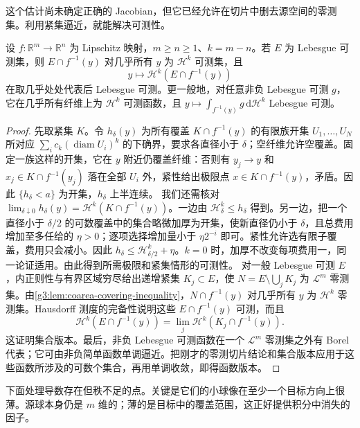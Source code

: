 这个估计尚未确定正确的 Jacobian，但它已经允许在切片中删去源空间的零测集。利用紧集逼近，就能解决可测性。

\begin{lemma}\label{g3:lem:coarea-slice-measurability}
	设 \(f:\mathbb R^m\to\mathbb R^n\) 为 Lipschitz 映射，\(m\ge n\ge1\)、\(k=m-n\)。若 \(E\) 为 Lebesgue 可测集，则 \(E\cap f^{-1}(y)\) 对几乎所有 \(y\) 为 \(\mathcal H^k\) 可测集，且
	\[
		y\longmapsto\mathcal H^k(E\cap f^{-1}(y))
	\]
	在取几乎处处代表后 Lebesgue 可测。更一般地，对任意非负 Lebesgue 可测 \(g\)，它在几乎所有纤维上为 \(\mathcal H^k\) 可测函数，且 \(y\mapsto\int_{f^{-1}(y)}g\,\mathrm d\mathcal H^k\) Lebesgue 可测。
\end{lemma}
\begin{proof}
	先取紧集 \(K\)。令 \(h_\delta(y)\) 为所有覆盖 \(K\cap f^{-1}(y)\) 的有限族开集 \(U_1,\ldots,U_N\) 所对应 \(\sum_i c_k(\operatorname{diam}U_i)^k\) 的下确界，要求各直径小于 \(\delta\)；空纤维允许空覆盖。固定一族这样的开集，它在 \(y\) 附近仍覆盖纤维：否则有 \(y_j\to y\) 和 \(x_j\in K\cap f^{-1}(y_j)\) 落在全部 \(U_i\) 外，紧性给出极限点 \(x\in K\cap f^{-1}(y)\)，矛盾。因此 \(\{h_\delta<a\}\) 为开集，\(h_\delta\) 上半连续。
	我们还需核对 \(\lim_{\delta\downarrow0}h_\delta(y)=\mathcal H^k(K\cap f^{-1}(y))\)。一边由 \(\mathcal H^k_\delta\le h_\delta\) 得到。另一边，把一个直径小于 \(\delta/2\) 的可数覆盖中的集合略微加厚为开集，使新直径仍小于 \(\delta\)，且总费用增加至多任给的 \(\eta>0\)；逐项选择增加量小于 \(\eta2^{-i}\) 即可。紧性允许选有限子覆盖，费用只会减小。因此 \(h_\delta\le\mathcal H^k_{\delta/2}+\eta\)。\(k=0\) 时，加厚不改变每项费用一，同一论证适用。由此得到所需极限和紧集情形的可测性。
	对一般 Lebesgue 可测 \(E\)，内正则性与有界区域穷尽给出递增紧集 \(K_j\subset E\)，使 \(N=E\setminus\bigcup_jK_j\) 为 \(\mathcal L^m\) 零测集。由\cref{g3:lem:coarea-covering-inequality}，\(N\cap f^{-1}(y)\) 对几乎所有 \(y\) 为 \(\mathcal H^k\) 零测集。Hausdorff 测度的完备性说明这些 \(E\cap f^{-1}(y)\) 可测，而且
	\[
		\mathcal H^k(E\cap f^{-1}(y))
		=\lim_j\mathcal H^k(K_j\cap f^{-1}(y)).
	\]
	这证明集合版本。最后，非负 Lebesgue 可测函数在一个 \(\mathcal L^m\) 零测集之外有 Borel 代表；它可由非负简单函数单调逼近。把刚才的零测切片结论和集合版本应用于这些函数所涉及的可数个集合，再用单调收敛，即得函数版本。
\end{proof}

下面处理导数存在但秩不足的点。关键是它们的小球像在至少一个目标方向上很薄。源球本身仍是 \(m\) 维的；薄的是目标中的覆盖范围，这正好提供积分中消失的因子。

